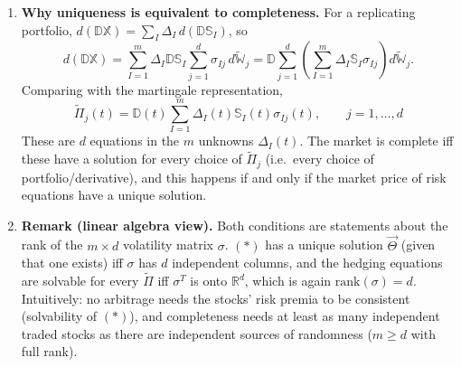 \begin{enumerate}
    \item \textbf{Why uniqueness is equivalent to completeness.} For a replicating portfolio, $d(\mathbb{D}\mathbb{X}) = \sum_I\Delta_I\, d(\mathbb{D}\mathbb{S}_I)$, so
    \[d(\mathbb{D}\mathbb{X}) = \sum_{I=1}^{m}\Delta_I\mathbb{D}\mathbb{S}_I\sum_{j=1}^{d}\sigma_{Ij}\, d\tilde{\mathbb{W}}_j = \mathbb{D}\sum_{j=1}^{d}\left(\sum_{I=1}^{m}\Delta_I\mathbb{S}_I\sigma_{Ij}\right)d\tilde{\mathbb{W}}_j.\]
    Comparing with the martingale representation,
    \[\boxed{\tilde{\Pi}_j(t) = \mathbb{D}(t)\sum_{I=1}^{m}\Delta_I(t)\mathbb{S}_I(t)\sigma_{Ij}(t), \qquad j = 1, \dots, d}\]
    These are $d$ equations in the $m$ unknowns $\Delta_I(t)$. The market is complete iff these have a solution for every choice of $\tilde{\Pi}_j$ (i.e.\ every choice of portfolio/derivative), and this happens if and only if the market price of risk equations have a unique solution.

    \item \textbf{Remark (linear algebra view).} Both conditions are statements about the rank of the $m \times d$ volatility matrix $\sigma$. $(\ast)$ has a unique solution $\vec{\Theta}$ (given that one exists) iff $\sigma$ has $d$ independent columns, and the hedging equations are solvable for every $\tilde{\Pi}$ iff $\sigma^T$ is onto $\mathbb{R}^d$, which is again $\mathrm{rank}(\sigma) = d$. Intuitively: no arbitrage needs the stocks' risk premia to be consistent (solvability of $(\ast)$), and completeness needs at least as many independent traded stocks as there are independent sources of randomness ($m \geq d$ with full rank).

\end{enumerate}

